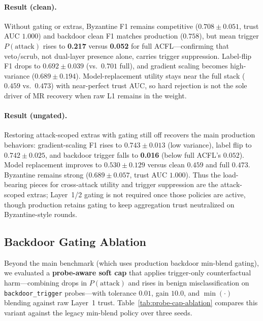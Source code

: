 \paragraph{Result (clean).}
Without gating or extras, Byzantine F1 remains competitive ($0.708 \pm 0.051$, trust AUC $1.000$) and backdoor clean F1 matches production ($0.758$), but mean trigger $P(\text{attack})$ rises to \textbf{0.217} versus \textbf{0.052} for full ACFL---confirming that veto/scrub, not dual-layer presence alone, carries trigger suppression.
Label-flip F1 drops to $0.692 \pm 0.039$ (vs.\ $0.701$ full), and gradient scaling becomes high-variance ($0.689 \pm 0.194$).
Model-replacement utility stays near the full stack ($0.459$ vs.\ $0.473$) with near-perfect trust AUC, so hard rejection is not the sole driver of MR recovery when raw L1 remains in the weight.

\paragraph{Result (ungated).}
Restoring attack-scoped extras with gating still off recovers the main production behaviors: gradient-scaling F1 rises to $0.743 \pm 0.013$ (low variance), label flip to $0.742 \pm 0.025$, and backdoor trigger falls to \textbf{0.016} (below full ACFL's $0.052$).
Model replacement improves to $0.530 \pm 0.129$ versus clean $0.459$ and full $0.473$.
Byzantine remains strong ($0.689 \pm 0.057$, trust AUC $1.000$).
Thus the load-bearing pieces for cross-attack utility and trigger suppression are the attack-scoped extras; Layer~1/2 gating is not required once those policies are active, though production retains gating to keep aggregation trust neutralized on Byzantine-style rounds.

\subsection{Backdoor Gating Ablation}
\label{sec:exp-probe-cap}

Beyond the main benchmark (which uses production backdoor min-blend gating), we evaluated a \textbf{probe-aware soft cap} that applies trigger-only counterfactual harm---combining drops in $P(\text{attack})$ and rises in benign misclassification on \texttt{backdoor\_trigger} probes---with tolerance $0.01$, gain $10.0$, and $\min(\cdot)$ blending against raw Layer~1 trust.
Table~\ref{tab:probe-cap-ablation} compares this variant against the legacy min-blend policy over three seeds.

